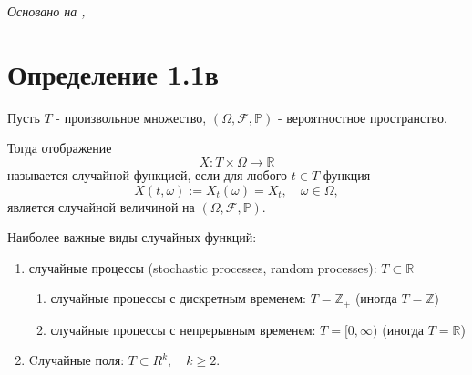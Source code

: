 \textit{Основано на \cite{adeshereKorrelyaciyaMezhduVremennymi2021},
\cite{panovTeoriyaSluchaynyhProcessov2018}}

\section*{Определение 1.1в}

Пусть \( T \) - произвольное множество, \( (\Omega, \mathcal{F},
\mathbb{P}) \) - вероятностное пространство.

Тогда отображение \[ X : T \times \Omega \to \mathbb{R} \] называется
случайной функцией, если для
любого \( t \in T \) функция \[ X(t, \omega) := X_t(\omega) = X_t,
\quad \omega \in \Omega, \]  является случайной величиной на \(
(\Omega, \mathcal{F}, \mathbb{P}) \).

Наиболее важные виды случайных функций:
\begin{enumerate}
  \item случайные процессы (stochastic processes, random processes):
    \( T \subset \mathbb{R} \)
    \begin{enumerate}
      \item случайные процессы с дискретным временем: \( T =
        \mathbb{Z}_+ \) (иногда \( T = \mathbb{Z} \))
      \item случайные процессы с непрерывным временем: \( T = [0,
        \infty) \) (иногда \( T = \mathbb{R} \))
    \end{enumerate}
  \item Cлучайные поля: \( T \subset R^k, \quad k \geq 2 \).
\end{enumerate}



